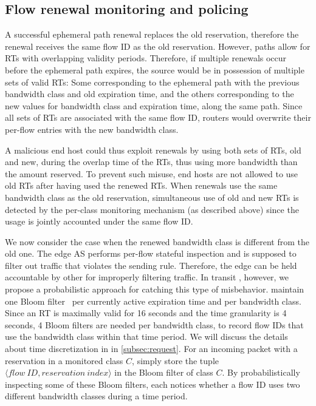 \subsection{Flow renewal monitoring and policing}\label{sec:monitoring-policing}
\label{sec:mon_renew}

\noindent
A successful ephemeral path renewal replaces the old
reservation, therefore the renewal receives the same flow ID as the old
reservation.  However, \name paths allow for RTs with
overlapping validity periods. Therefore, if multiple renewals occur before the
ephemeral path expires, the source would be in possession of multiple sets of
valid RTs: Some corresponding to the ephemeral path with the previous bandwidth class
and old expiration time, and the others corresponding to the new values for
bandwidth class and expiration time, along the same path.  Since all sets of
RTs are associated with the same flow ID, routers would overwrite their
per-flow entries with the new bandwidth class.

A malicious end host could thus exploit renewals by using both sets of RTs, old
and new, during the overlap time of the RTs, thus using more bandwidth than the
amount reserved. To prevent such misuse, end hosts are not allowed to use old
RTs after having used the renewed RTs. When renewals use the same bandwidth
class as the old reservation, simultaneous use of old and new RTs is detected
by the per-class monitoring mechanism (as described above) since the usage is
jointly accounted under the same flow ID.

We now consider the case when the renewed bandwidth class is different from the
old one. The edge AS performs per-flow stateful inspection and is supposed to
filter out traffic that violates the sending rule. Therefore, the edge \AD can
be held accountable by other \ADs for improperly filtering traffic. In transit
\ADs, however, we propose a probabilistic approach for catching this type of
misbehavior. \ADs maintain one Bloom filter~\cite{bloom} per currently active
expiration time and per bandwidth class. Since an RT is maximally valid for 16
seconds and the time granularity is 4 seconds, 4 Bloom filters are needed per
bandwidth class, to record flow IDs that use the bandwidth class within that
time period. We will discuss the details about time discretization in \name in
\autoref{subsec:request}. For an incoming packet with a reservation in a
monitored class $C$, \ADs simply store the tuple $\langle \mathit{flow\ ID},
\mathit{reservation\ index}\rangle$ in the Bloom filter of class $C$. By
probabilistically inspecting some of these Bloom filters, each \AD notices
whether a flow ID uses two different bandwidth classes during a time period.

